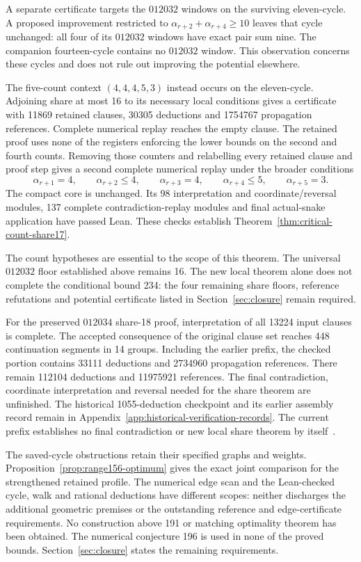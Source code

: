 \documentclass[11pt,a4paper]{article}
\theoremstyle{definition}
\theoremstyle{remark}
\begin{document}
A separate certificate targets the $012032$ windows on the surviving
eleven-cycle. A proposed improvement restricted to
$\alpha_{r+2}+\alpha_{r+4}\ge10$ leaves that cycle unchanged: all four
of its $012032$ windows have exact pair sum nine. The companion
fourteen-cycle contains no $012032$ window. This observation concerns
these cycles and does not rule out improving the potential elsewhere.

The five-count context $(4,4,4,5,3)$ instead occurs on the eleven-cycle.
Adjoining share at most 16 to its necessary local conditions gives a
certificate with 11869 retained clauses, 30305 deductions and 1754767
propagation references. Complete numerical replay reaches the empty clause.
The retained proof uses none of the registers enforcing the lower bounds
on the second and fourth counts. Removing those counters and relabelling
every retained clause and proof step gives a second complete numerical
replay under the broader conditions
\[
\alpha_{r+1}=4,\qquad \alpha_{r+2}\le4,\qquad
\alpha_{r+3}=4,\qquad \alpha_{r+4}\le5,\qquad
\alpha_{r+5}=3.
\]
The compact core is unchanged. Its 98 interpretation and coordinate/reversal
modules, 137 complete contradiction-replay modules and final actual-snake
application have passed Lean. These checks establish
Theorem~\ref{thm:critical-count-share17}.



The count hypotheses are essential to the scope of this theorem. The
universal $012032$ floor established above remains 16. The new local
theorem alone does not complete the conditional bound 234: the four
remaining share floors, reference refutations and potential certificate
listed in Section~\ref{sec:closure} remain required.

For the preserved $012034$ share-18 proof, interpretation of all 13224
input clauses is complete. The accepted consequence of the original
clause set reaches 448 continuation segments in 14 groups. Including
the earlier prefix, the checked portion contains 33111 deductions and
2734960 propagation references. There remain 112104 deductions and
11975921 references. The final contradiction, coordinate interpretation
and reversal needed for the share theorem are unfinished. The historical
1055-deduction checkpoint and its earlier assembly record remain in
Appendix~\ref{app:historical-verification-records}. The current prefix
establishes no final contradiction or new local share theorem
by itself~\cite{replay165archive}.

The saved-cycle obstructions retain their specified graphs and weights.
Proposition~\ref{prop:range156-optimum} gives the exact joint comparison
for the strengthened retained profile. The numerical edge scan and the
Lean-checked cycle, walk and rational deductions have different scopes:
neither discharges the additional geometric premises or the outstanding
reference and edge-certificate requirements. No construction above 191 or
matching optimality theorem has been obtained. The numerical conjecture
196 is used in none of the proved bounds. Section~\ref{sec:closure} states
the remaining requirements.
\end{document}
